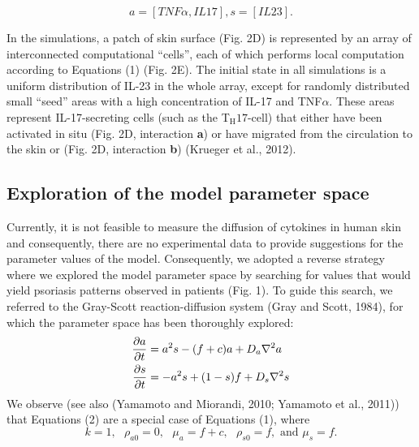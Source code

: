 \[a=[TNF\alpha, IL17], s=[IL23].\]

In the simulations, a patch of skin surface (Fig. 2D) is represented by an array of interconnected computational “cells”, each of which performs local computation according to Equations (1) (Fig. 2E). The initial state in all simulations is a uniform distribution of IL-23 in the whole array, except for randomly distributed small “seed” areas with a high concentration of IL-17 and TNF$\alpha$. These areas represent IL-17-secreting cells (such as the T$_{\text{H}}17$-cell) that either have been activated in situ (Fig. 2D, interaction \textbf{a}) or have migrated from the circulation to the skin or (Fig. 2D, interaction \textbf{b}) (Krueger et al., 2012). 

\subsection{Exploration of the model parameter space}
Currently, it is not feasible to measure the diffusion of cytokines in human skin and consequently, there are no experimental data to provide suggestions for the parameter values of the model. Consequently, we adopted a reverse strategy where we explored the model parameter space by searching for values that would yield psoriasis patterns observed in patients (Fig. 1). To guide this search, we referred to the Gray-Scott reaction-diffusion system (Gray and Scott, 1984), for which the parameter space has been thoroughly explored:
\begin{equation}
	\begin{aligned} \label{eq:gsPsoriasis}
	\frac{\partial a}{\partial t} &= a^2s-(f+c)a+ D_a \nabla^2 a \\
	\frac{\partial s}{\partial t} &= -a^2s+(1-s)f + D_s \nabla^2 s
	\end{aligned}
\end{equation}
We observe (see also (Yamamoto and Miorandi, 2010; Yamamoto et al., 2011)) that Equations (2) are a special case of Equations (1), where
\[ k=1,\text{   }\rho_{a0}=0,\text{   }\mu_a=f+c,\text{   }\rho_{s0}=f,\text{ and }\mu_s=f.\]
